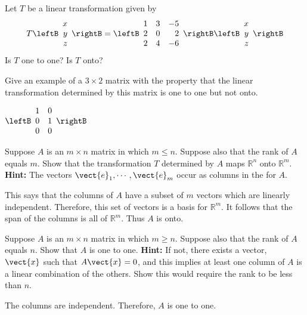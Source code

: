 \begin{enumialphparenastyle}
\begin{ex} Let $T$ be a linear transformation given by 
\[
T \leftB \begin{array}{r}
x\\
y \\
z
\end{array}\rightB = \leftB \begin{array}{rrr}
1 & 3 & -5  \\
2 & 0 & 2 \\
2 & 4 & -6 
\end{array}\rightB
 \leftB \begin{array}{r}
x\\
y \\
z
\end{array}\rightB 
\]
Is $T$ one to one? Is $T$ onto?
\end{ex}


\begin{ex} Give an example of a $3\times 2$ matrix with the property that the
linear transformation determined by this matrix is one to one but not onto. 
\begin{sol}
$\leftB
\begin{array}{cc}
1 & 0 \\
0 & 1 \\
0 & 0
\end{array}
\rightB $
\end{sol}
\end{ex}

\begin{ex} Suppose $A$ is an $m\times n$ matrix in which $m\leq n.$ Suppose also
that the rank of $A$ equals $m.$ Show that the transformation $T$ determined by $A$ 
maps $\mathbb{R}^{n}$ onto $\mathbb{R}^{m}$.
 \textbf{Hint: }The vectors $\vect{e}_{1},\cdots , \vect{e}_{m}$ occur as columns in the {\rref} for $A.$ \vspace{1mm} 
\begin{sol}
 This says
that the columns of $A$ have a subset of $m$ vectors which are linearly
independent. Therefore, this set of vectors is a basis for $\mathbb{R}^{m}$.
It follows that the span of the columns is all of $\mathbb{R}^{m}$. Thus $A$
is onto.
\end{sol}
\end{ex}

\begin{ex} Suppose $A$ is an $m\times n$ matrix in which $m\geq n.$ Suppose also
that the rank of $A$ equals $n.$ Show that $A$ is one to one. \textbf{Hint: }
If not, there exists a vector, $\vect{x}$ such that $A\vect{x}=0$, and
this implies at least one column of $A$ is a linear combination of the
others. Show this would require the rank to be less than $n.$ \vspace{1mm}
\begin{sol}
The
columns are independent. Therefore, $A$ is one to one.
\end{sol}
\end{ex}


\end{enumialphparenastyle}
